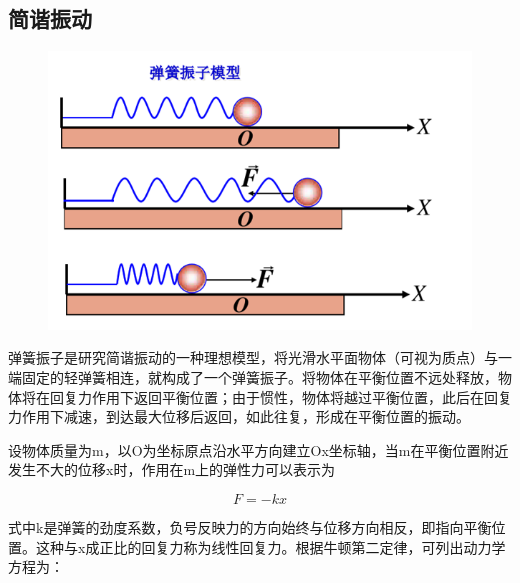 \documentclass[12pt,a4paper]{ctexart}
\begin{document}
	\subsection{简谐振动}
	\begin{figure}[h] %
		\centering %
		\includegraphics[scale=0.6]{T11.PNG} %
	\end{figure}%
	\indent
	弹簧振子是研究简谐振动的一种理想模型，将光滑水平面物体（可视为质点）与一端固定的轻弹簧相连，就构成了一个弹簧振子。将物体在平衡位置不远处释放，物体将在回复力作用下返回平衡位置；由于惯性，物体将越过平衡位置，此后在回复力作用下减速，到达最大位移后返回，如此往复，形成在平衡位置的振动。
	
	
	
	
	

	设物体质量为m，以O为坐标原点沿水平方向建立Ox坐标轴，当m在平衡位置附近发生不大的位移x时，作用在m上的弹性力可以表示为
	
	$$F=-kx$$
	
	式中k是弹簧的劲度系数，负号反映力的方向始终与位移方向相反，即指向平衡位置。这种与x成正比的回复力称为线性回复力。根据牛顿第二定律，可列出动力学方程为：
	
\end{document}
